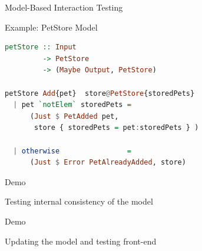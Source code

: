 \begin{frame}[fragile]{Model-Based Interaction Testing}
{\begin{center}
    \end{center}
  }
\end{frame}



\begin{frame}[fragile]{Example: PetStore Model}
\begin{lstlisting}[language=Haskell,basicstyle=\ttfamily,keywordstyle=\color{red}]
petStore :: Input
         -> PetStore
         -> (Maybe Output, PetStore)

petStore Add{pet}  store@PetStore{storedPets}
  | pet `notElem` storedPets =
      (Just $ PetAdded pet,
       store { storedPets = pet:storedPets } )

  | otherwise                =
      (Just $ Error PetAlreadyAdded, store)
\end{lstlisting}
\end{frame}

\begin{frame}[fragile]{Demo}
  \begin{center}
    \Huge{Testing internal consistency of the model}
  \end{center}
\end{frame}

\begin{frame}[fragile]{Demo}
  \begin{center}
    \Huge{Updating the model and testing front-end}
  \end{center}
\end{frame}

